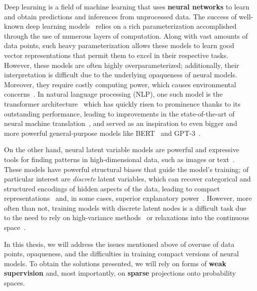 \label{cap:int}

\cleardoublepage
\doublespacing

\noindent Deep learning is a field of machine learning that uses
\textbf{neural networks} to learn and obtain predictions
and inferences from unprocessed data. The success of well-known deep
learning models~\citep[\textit{inter
        alia}]{convnet,devlin2018bert,brown2020language} relies on a rich
parameterization accomplished through the use of numerous layers of
computation. Along with vast amounts of data points,
such heavy parameterization allows these models to learn good
vector representations that permit them to excel in their respective
tasks. However, these models are often highly overparameterized;
additionally, their interpretation is difficult due to the underlying
opaqueness of neural models. Moreover, they require costly computing
power, which causes environmental concerns~\citep{Strubell2019}. In
natural language processing (NLP), one such model is the transformer
architecture~\citep{vaswani2017attention} which has quickly risen to
prominence thanks to its outstanding performance, leading to
improvements in the state-of-the-art of neural machine
translation~\citep[NMT;][]{marian,ott2018scaling}, and served as an
inspiration to even bigger and more powerful general-purpose models
like BERT~\citep{devlin2018bert} and
\mbox{GPT-3}~\citep{brown2020language}.

On the other hand, neural latent variable models are powerful and
expressive tools for finding patterns in high-dimensional data, such
as images or text~\citep{Kim2018,Kingma+2014:VAE,RezendeEtAl14VAE}.
These models have powerful structural biases that guide the model's
training; of particular
interest are \emph{discrete} latent variables, which can recover
categorical and structured encodings of hidden aspects of the data,
leading to compact representations~\citep{KingmaEtAl2014SSVAE} and,
in some cases, superior explanatory power~\citep{titov2008joint,
    Bastings2019}. However, more often than not, training models with
discrete latent nodes is a difficult task due to the need to rely on
high-variance methods~\citep{Williams1992} or relaxations into the
continuous space~\citep{GumbelSoftmax,Concrete}.

In this thesis, we will address the issues mentioned above of overuse
of data points, opaqueness, and the difficulties in training compact
versions of neural models. To obtain the solutions presented, we will
rely on forms of \textbf{weak supervision} and, most importantly, on
\textbf{sparse} projections onto probability spaces.

